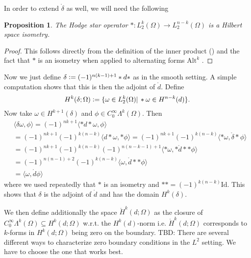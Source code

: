 \documentclass[12pt,a4paper]{article}
\newtheorem{proposition}{Proposition}
\theoremstyle{definition}
\newcommand{\smoothcompforms}[2]{C_0^\infty \Lambda^{#1}(#2)}
\begin{document}
In order to extend $\mathring{\delta}$ as well, we will need the following
\begin{proposition}
    The Hodge star operator $*:L^k_2(\Omega) \rightarrow L^{n-k}_2(\Omega)$ is a
    Hilbert space isometry.
\end{proposition}
\begin{proof}
    This follows directly from the definition of the inner product 
    () and the fact that $*$ is an isometry 
    when applied to alternating forms $\text{Alt}^k$ \cite[p.66]{arnold}.
\end{proof}
Now we just define $\delta \vcentcolon= (-1)^{n(k-1)+1}*d*$ as in the smooth
setting. A simple computation shows that this is 
then the adjoint of $\mathring{d}$. Define 
\begin{align*}
    H^k(\delta; \Omega) \vcentcolon= \{ \omega \in L^k_2(\Omega) | \,
    *\omega \in H^{n-k}(d) \}.
\end{align*}
Now take $\omega \in H^{k+1}(\delta)$ and $\phi \in 
\smoothcompforms{k}{\Omega}$. Then 
\begin{align*}
    &\langle \delta \omega, \phi \rangle = 
    (-1)^{nk+1} \langle *d* \omega, \phi \rangle \\  
    &= (-1)^{nk+1} (-1)^{k(n-k)} \langle d* \omega, *\phi \rangle =
    (-1)^{nk+1} (-1)^{k(n-k)} 
        \langle * \omega, \mathring{\delta}*\phi \rangle \\
    &= (-1)^{nk+1} (-1)^{k(n-k)} (-1)^{n(n-k-1)+1}
        \langle * \omega, *\mathring{d}**\phi \rangle \\
    &=(-1)^{n(n-1)+2} (-1)^{k(n-k)} \langle \omega, \mathring{d}**\phi \rangle\\
    &= \langle \omega, \mathring{d}\phi \rangle
\end{align*}
where we used repeatedly that $*$ is an isometry and 
$** = (-1)^{k(n-k)}\text{Id}$. This shows that $\delta$ is the adjoint of 
$\mathring{d}$ and has the domain $H^k(\delta)$.


We then define 
additionally the space $\mathring{H}^k(d;\Omega)$ as the closure of 
$C_0^\infty \Lambda^k(\Omega) \subseteq H^k(d;\Omega)$ w.r.t. 
the $H^k(d)$-norm i.e. 
$\mathring{H}^k(d;\Omega)$ corresponds to $k$-forms in $H^k(d;\Omega)$
being zero on the boundary. {\color{red} TBD: There are several different 
ways to characterize zero boundary conditions in the $L^2$ setting. We have
to choose the one that works best.}
\end{document}
